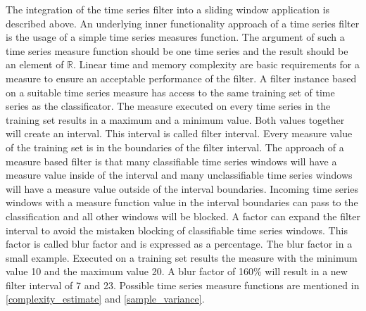 The integration of the time series filter into a sliding window application is described above. An underlying inner
functionality approach of a time series filter is the usage of a simple time series measures function. The argument of
such a time series measure function should be one time series and the result should be an element of $\mathbb{R}$.
Linear time and memory complexity are basic requirements for a measure to ensure an acceptable performance of the
filter. A filter instance based on a suitable time series measure has access to the same training set of time series as
the classificator. The measure executed on every time series in the training set results in a maximum and a minimum
value. Both values together will create an interval. This interval is called filter interval. Every measure value of the
training set is in the boundaries of the filter interval. The approach of a measure based filter is that many
classifiable time series windows will have a measure value inside of the interval and many unclassifiable time series
windows will have a measure value outside of the interval boundaries. Incoming time series windows with a measure
function value in the interval boundaries can pass to the classification and all other windows will be blocked. A factor
can expand the filter interval to avoid the mistaken blocking of classifiable time series windows. This factor is called
blur factor and is expressed as a percentage. The blur factor in a small example. Executed on a training set results the
measure with the minimum value 10 and the maximum value 20. A blur factor of 160\% will result in a new filter interval
of 7 and 23. Possible time series measure functions are mentioned in \ref{complexity_estimate} and
\ref{sample_variance}.
